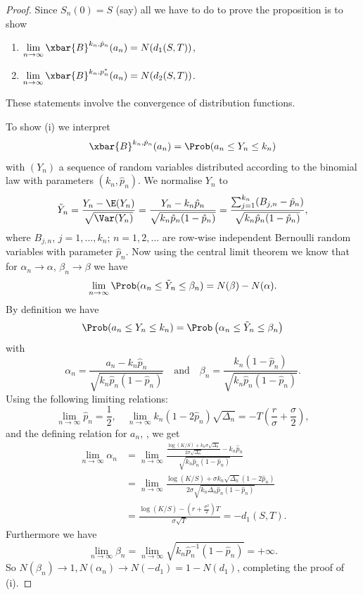 \begin{proof}
	Since $S_n(0) = S$ (say) all we have to do to prove the proposition is to show
	\begin{enumerate}[label=(\roman*)]
		\item $\displaystyle \lim_{n\to\infty} \xbar{B}^{k_n, \hat{p}_n}(a_n) = N(d_1(S,T))$,
		\item $\displaystyle \lim_{n\to\infty} \xbar{B}^{k_n, p_n^*}(a_n) = N(d_2(S,T))$.
	\end{enumerate}
	These statements involve the convergence of distribution functions.

	To show (i) we interpret
	\[
		\xbar{B}^{k_n, \hat{p}_n}(a_n) = \Prob(a_n \le Y_n \le k_n)
	\]
	with $(Y_n)$ a sequence of random variables distributed according to the binomial law with parameters $(k_n, \hat{p}_n)$. We normalise $Y_n$ to
	\[
		\tilde{Y}_n = \frac{Y_n - \E(Y_n)}{\sqrt{\Var(Y_n)}} = \frac{Y_n - k_n\hat{p}_n}{\sqrt{k_n\hat{p}_n(1-\hat{p}_n)}} = \frac{\sum_{j=1}^{k_n} (B_{j,n} - \hat{p}_n)}{\sqrt{k_n\hat{p}_n(1-\hat{p}_n)}},
	\]
	where $B_{j,n}$, $j=1,\dots,k_n$; $n=1,2,\dots$ are row-wise independent Bernoulli random variables with parameter $\hat{p}_n$. Now using the central limit theorem we know that for $\alpha_n \to \alpha$, $\beta_n \to \beta$ we have
	\[
		\lim_{n\to\infty} \Prob(\alpha_n \le \tilde{Y}_n \le \beta_n) = N(\beta) - N(\alpha).
	\]
	By definition we have
	\[
		\Prob(a_n \le Y_n \le k_n) = \Prob \left(\alpha_n \le \tilde{Y}_n \le \beta_n\right)
	\]
	with
	\[
		\alpha_n = \frac{a_n - k_n\hat{p}_n}{\sqrt{k_n\hat{p}_n(1-\hat{p}_n)}} \quad \text{and} \quad \beta_n = \frac{k_n(1-\hat{p}_n)}{\sqrt{k_n\hat{p}_n(1-\hat{p}_n)}}.
	\]
	Using the following limiting relations:
	\[
		\lim_{n\to\infty} \hat{p}_n = \frac{1}{2}, \quad \lim_{n\to\infty} k_n(1 - 2\hat{p}_n)\sqrt{\Delta_n} = -T \left(\frac{r}{\sigma} + \frac{\sigma}{2}\right),
	\]
	and the defining relation for $a_n$, , we get
	\begin{align*}
		\lim_{n\to\infty} \alpha_n & = \lim_{n\to\infty} \frac{\frac{\log(K/S) + k_n\sigma\sqrt{\Delta_n}}{2\sigma\sqrt{\Delta_n}} - k_n\hat{p}_n}{\sqrt{k_n\hat{p}_n(1-\hat{p}_n)}} \\
		                           & = \lim_{n\to\infty} \frac{\log(K/S) + \sigma k_n \sqrt{\Delta_n}(1 - 2\hat{p}_n)}{2\sigma \sqrt{k_n\Delta_n\hat{p}_n(1-\hat{p}_n)}}             \\
		                           & = \frac{\log(K/S) - (r + \frac{\sigma^2}{2})T}{\sigma\sqrt{T}} = -d_1(S,T).
	\end{align*}
	Furthermore we have
	\[
		\lim_{n\to\infty} \beta_n = \lim_{n\to\infty} \sqrt{k_n\hat{p}_n^{-1}(1 - \hat{p}_n)} = +\infty.
	\]
	So $N(\beta_n) \to 1, N(\alpha_n) \to N(-d_1) = 1 - N(d_1)$, completing the proof of (i).


\end{proof}
